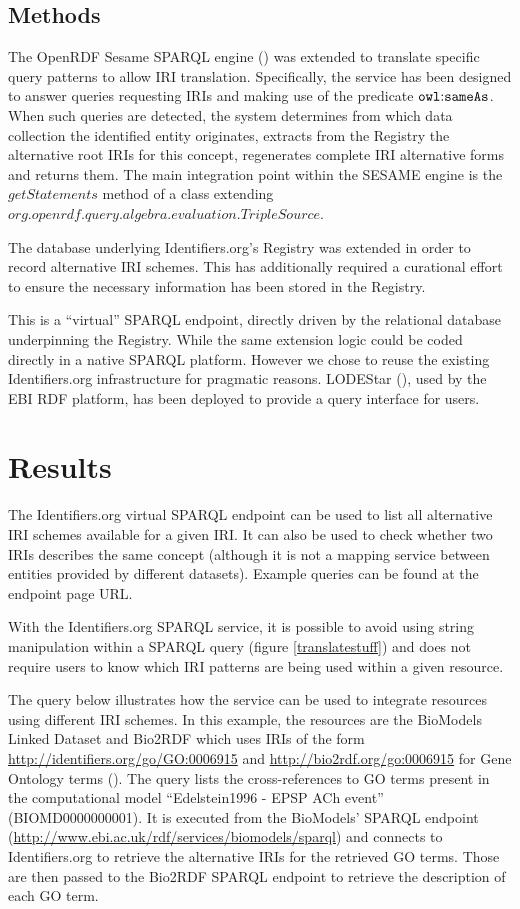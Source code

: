 \documentclass{bioinfo}
\begin{document}
\begin{methods}
\section{Methods}
The OpenRDF Sesame SPARQL engine (\cite{SESAME}) was extended to translate specific query patterns to allow IRI translation. Specifically, the service has been designed to answer queries requesting IRIs and making use of the predicate $\mathtt{owl\text{\rm :}{}sameAs}$. When such queries are detected, the system determines from which data collection the identified entity originates, extracts from the Registry the alternative root IRIs for this concept, regenerates complete IRI alternative forms and returns them. The main integration point within the SESAME engine is the $getStatements$ method of a class extending $org.openrdf.query.algebra.evaluation.TripleSource$.

The database underlying Identifiers.org's Registry was extended in order to record alternative IRI schemes. This has additionally required a curational effort to ensure the necessary information has been stored in the Registry.

This is a ``virtual'' SPARQL endpoint, directly driven by the relational database underpinning the Registry.
While the same extension logic could be coded directly in a native SPARQL platform. However we chose to reuse the existing Identifiers.org infrastructure for pragmatic reasons. 
LODEStar (\cite{LODEStar}), used by the EBI RDF platform, has been deployed to provide a query interface for users.
\end{methods}

\section{Results}
The Identifiers.org virtual SPARQL endpoint can be used to list all alternative IRI schemes available for a given IRI. It can also be used to check whether two IRIs describes the same concept (although it is not a mapping service between entities provided by different datasets). Example queries can be found at the endpoint page URL.

With the Identifiers.org SPARQL service, it is possible to avoid using string manipulation within a SPARQL query (figure \ref{translatestuff}) and does not require users to know which IRI patterns are being used within a given resource.

The query below illustrates how the service can be used to integrate resources using different IRI schemes. 
In this example, the resources are the BioModels Linked Dataset and Bio2RDF which uses IRIs of the form \url{http://identifiers.org/go/GO:0006915} and \url{http://bio2rdf.org/go:0006915} for Gene Ontology terms (\cite{Ashburner2000}). 
The query lists the cross-references to GO terms present in the computational model ``Edelstein1996 - EPSP ACh event'' (BIOMD0000000001).
It is executed from the BioModels' SPARQL endpoint (\url{http://www.ebi.ac.uk/rdf/services/biomodels/sparql}) and connects to Identifiers.org to retrieve the alternative IRIs for the retrieved GO terms. Those are then passed to the Bio2RDF SPARQL endpoint to retrieve the description of each GO term.
\end{document}

